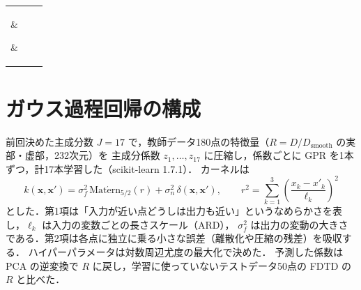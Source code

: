 \documentclass{jarticle}
\begin{document}
%
\begin{center}
 \begin{tabular}{|c|c|c|} \hline
  \parbox{50mm}{\vspace{1mm} } &
  \parbox{55mm}{\vspace{1mm} } &
  \parbox{50mm}{\vspace{1mm} }
  \\ [2mm] \hline
%
  \\ [2mm] \hline\hline
%
  \\ [2mm] \hline
 \end{tabular}
\end{center}
\par



\section{ガウス過程回帰の構成}
前回決めた主成分数 $J=17$ で，教師データ180点の特徴量（$R = D / D_{\mathrm{smooth}}$ の実部・虚部，232次元）を
主成分係数 $z_1, \dots, z_{17}$ に圧縮し，係数ごとに GPR を1本ずつ，計17本学習した（scikit-learn 1.7.1）．
カーネルは
\begin{equation}
 k(\boldsymbol{x}, \boldsymbol{x}') = \sigma_f^2 \, \mathrm{Mat\acute{e}rn}_{5/2}(r) + \sigma_n^2 \, \delta(\boldsymbol{x}, \boldsymbol{x}'),
 \qquad
 r^2 = \sum_{k=1}^{3} \left( \frac{x_k - x'_k}{\ell_k} \right)^2
\end{equation}
とした．第1項は「入力が近い点どうしは出力も近い」というなめらかさを表し，$\ell_k$ は入力の変数ごとの長さスケール（ARD），
$\sigma_f^2$ は出力の変動の大きさである．第2項は各点に独立に乗る小さな誤差（離散化や圧縮の残差）を吸収する．
ハイパーパラメータは対数周辺尤度の最大化で決めた．
予測した係数は PCA の逆変換で $R$ に戻し，学習に使っていないテストデータ50点の FDTD の $R$ と比べた．
\end{document}
